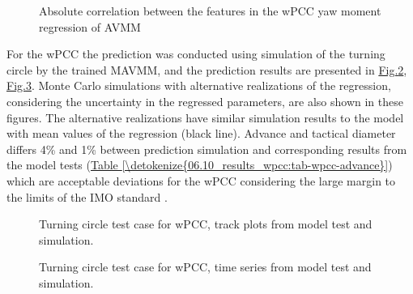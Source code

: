 \documentclass[review]{elsarticle}
\begin{document}
\begin{figure}[H]
\centering
\capstart

\noindent{}
\caption{Absolute correlation between the features in the wPCC yaw moment regression of AVMM}\label{\detokenize{06.10_results_wpcc:fig-ncorr}}\end{figure}

\sphinxAtStartPar
For the wPCC the prediction was conducted using simulation of the turning circle by the trained MAVMM, and the prediction results are presented in \hyperref[\detokenize{06.10_results_wpcc:fig-track-plot-testing-sim}]{Fig.\@ \ref{\detokenize{06.10_results_wpcc:fig-track-plot-testing-sim}}}, \hyperref[\detokenize{06.10_results_wpcc:fig-testing-sim}]{Fig.\@ \ref{\detokenize{06.10_results_wpcc:fig-testing-sim}}}. Monte Carlo simulations with alternative realizations of the regression, considering the uncertainty in the regressed parameters, are also shown in these figures. The alternative realizations have similar simulation results to the model with mean values of the regression (black line).
Advance and tactical diameter \cite{imo_standards_2002} differs 4\% and 1\% between prediction simulation and corresponding results from the model tests (\hyperref[\detokenize{06.10_results_wpcc:tab-wpcc-advance}]{Table \ref{\detokenize{06.10_results_wpcc:tab-wpcc-advance}}})
which are acceptable deviations for the wPCC considering the large margin to the limits of the IMO standard \cite{imo_standards_2002}.

\begin{figure}[H]
\centering
\capstart

\noindent{}
\caption{Turning circle test case for wPCC, track plots from model test and simulation.}\label{\detokenize{06.10_results_wpcc:fig-track-plot-testing-sim}}\end{figure}

\begin{figure}[H]
\centering
\capstart

\noindent{}
\caption{Turning circle test case for wPCC, time series from model test and simulation.}\label{\detokenize{06.10_results_wpcc:fig-testing-sim}}\end{figure}
\end{document}
